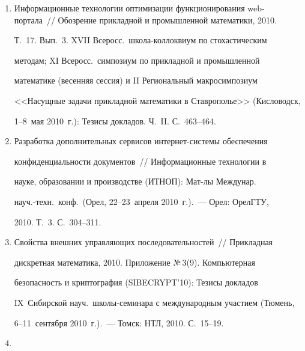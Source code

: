 \begin{enumerate}[1.]
Междунар.\ науч.-техн.\ конф.\ (Орел, 22--23~апреля 2010~г.).~--- Орел: 


ОрелГТУ, 2010. Т.~3. С.~292--298.





\item {}


Информационные технологии оптимизации функционирования web-портала~/\!\!/  Обозрение прикладной и промышленной математики, 2010. 


Т.~17. Вып.~3. XVII Всеросс.\ школа-коллоквиум по стохастическим 


методам; XI Всеросс.\ симпозиум по прикладной и промышленной 


математике (весенняя сессия) и II Региональный макросимпозиум 


<<Насущные задачи прикладной математики в Ставрополье>> (Кисловодск, 


1--8~мая 2010~г.): Тезисы докладов. Ч.~II. С.~463--464.


\item {}


Разработка дополнительных сервисов интернет-сис\-те\-мы обеспечения 


конфиденциальности документов~/\!\!/  Информационные технологии в 


науке, образовании и производстве (ИТНОП): Мат-лы Междунар.\ 


науч.-техн.\ конф.\ (Орел, 22--23~апреля 2010~г.).~--- Орел: ОрелГТУ, 


2010. Т.~3. С.~304--311.





\item {}


Свойства внешних управляющих последовательностей~/\!\!/  Прикладная 


дискретная математика, 2010. Приложение №\,3(9). Компьютерная 


безопасность и криптография (SIBECRYPT'10): Тезисы докладов 


IX~Сибирской науч.\ школы-семинара с международным участием (Тюмень, 


6--11~сентября 2010~г.).~--- Томск: НТЛ, 2010. С.~15--19.





\item {}



\end{enumerate}
